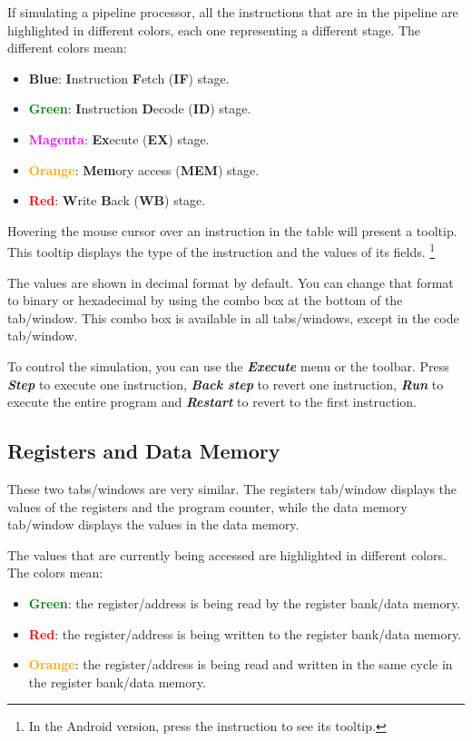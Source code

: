 \documentclass[11pt,a4paper,twoside,titlepage]{article}
\newcommand{\menupath}[1]{\textbf{\emph{#1}}}
\begin{document}
If simulating a pipeline processor, all the instructions that are in the
pipeline are highlighted in different colors, each one representing a
different stage.
The different colors mean:
\begin{itemize}
	\item \textbf{\textcolor{cyan2}{Blue}}: \textbf{I}nstruction 
		\textbf{F}etch (\textbf{IF}) stage.
	\item \textbf{\textcolor{green}{Green}}: \textbf{I}nstruction 
		\textbf{D}ecode (\textbf{ID}) stage.
	\item \textbf{\textcolor{magenta}{Magenta}}: \textbf{Ex}ecute 
		(\textbf{EX}) stage.
	\item \textbf{\textcolor{orange}{Orange}}: \textbf{Mem}ory access
		(\textbf{MEM}) stage.
	\item \textbf{\textcolor{red}{Red}}: \textbf{W}rite \textbf{B}ack 
		(\textbf{WB}) stage.
\end{itemize}

Hovering the mouse cursor over an instruction in the table will present a
tooltip. This tooltip displays the type of the instruction and the values
of its fields. \footnote{In the Android version, press the instruction to
see its tooltip.}

The values are shown in decimal format by default.
You can change that format to binary or hexadecimal by using the combo box
at the bottom of the tab/window.
This combo box is available in all tabs/windows, except in the code tab/window.

To control the simulation, you can use the \menupath{Execute} menu or the toolbar.
Press \menupath{Step} to execute one instruction, \menupath{Back step}
to revert one instruction, \menupath{Run} to execute the entire program and
\menupath{Restart} to revert to the first instruction.


\subsection{Registers and Data Memory}

These two tabs/windows are very similar.
The registers tab/window displays the values of the registers and the program
counter, while the data memory tab/window displays the values in the data
memory.

The values that are currently being accessed are highlighted in different 
colors. The colors mean:
\begin{itemize}
	\item \textbf{\textcolor{green}{Green}}: the register/address is being 
		read by the register bank/data memory.
	\item \textbf{\textcolor{red}{Red}}: the register/address is being written 
		to the register bank/data memory.
	\item \textbf{\textcolor{orange}{Orange}}: the register/address is being 
		read and written in the same cycle in the register bank/data memory.
\end{itemize}
\end{document}
